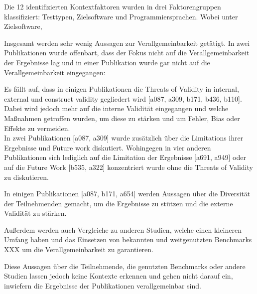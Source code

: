 Die 12 identifizierten Kontextfaktoren wurden in drei Faktorengruppen klassifiziert:
Testtypen, Zielsoftware und Programmiersprachen. Wobei unter Zielsoftware, %


\clearpage

Insgesamt werden sehr wenig Aussagen zur Verallgemeinbarkeit getätigt.
In zwei Publikationen wurde offenbart, dass der Fokus nicht auf die Verallgemeinbarkeit der Ergebnisse lag
und in einer Publikation wurde gar nicht auf die Verallgemeinbarkeit eingegangen:


Es fällt auf, dass in einigen Publikationen die Threats of Validity in internal, external und construct validity gegliedert wird [a087, a309, b171, b436, b110].
Dabei wird jedoch mehr auf die interne Validität eingegangen und welche Maßnahmen getroffen wurden,
um diese zu stärken und um Fehler, Bias oder Effekte zu vermeiden. \\

In zwei Publikationen [a087, a309] wurde zusätzlich über die Limitations ihrer Ergebnisse und Future work diskutiert.
Wohingegen in vier anderen Publikationen sich lediglich auf die Limitation der Ergebnisse [a691, a949]
oder auf die Future Work [b535, a322] konzentriert wurde ohne die Threats of Validity zu diskutieren.



In einigen Publikationen [a087, b171, a654] werden Aussagen über die Diversität der Teilnehmenden gemacht,
um die Ergebnisse zu stützen und die externe Validität zu stärken.



Außerdem werden auch Vergleiche zu anderen Studien,
welche einen kleineren Umfang haben und das Einsetzen von bekannten und weitgenutzten Benchmarks XXX
um die Verallgemeinbarkeit zu garantieren.


Diese Aussagen über die Teilnehmende, die genutzten Benchmarks oder andere Studien lassen jedoch keine Kontexte erkennen
und gehen nicht darauf ein, inwiefern die Ergebnisse der Publikationen verallgemeinbar sind.












